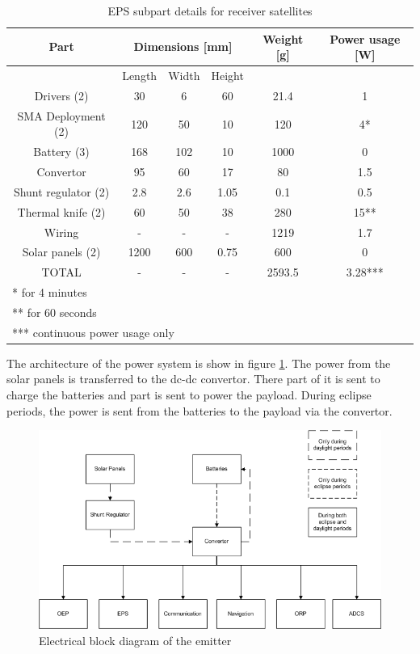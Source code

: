 \begin{table}[H!]
\centering
\begin{tabular}{cccccc}
\toprule
Part & \multicolumn{3}{c}{Dimensions [mm]} & Weight [g] & Power usage [W]\\ 
\midrule
 & Length & Width & Height & & \\ 
 Drivers (2) & 30 & 6 & 60 & 21.4 & 1 \\ 
 SMA Deployment (2) & 120 & 50 & 10 & 120 & 4* \\ 
 Battery (3) & 168 & 102 & 10 & 1000 & 0 \\ 
 Convertor & 95 & 60 & 17 & 80 & 1.5 \\ 
 Shunt regulator (2) & 2.8 & 2.6 & 1.05 & 0.1 & 0.5 \\ 
 Thermal knife (2) & 60 & 50 & 38 & 280 & 15**  \\
 Wiring & - & - & - & 1219 & 1.7 \\ 
 Solar panels (2) & 1200 & 600 & 0.75 & 600 & 0 \\
 \midrule
 TOTAL & - & - & - & 2593.5 & 3.28***  \\ 
\bottomrule
 \multicolumn{6}{l}{* for 4 minutes} \\
 \multicolumn{6}{l}{** for 60 seconds} \\
 \multicolumn{6}{l}{*** continuous power usage only} \\
\end{tabular}
\caption{EPS subpart details for receiver satellites}
\label{tab:EPS_details}
\end{table}

The architecture of the power system is show in figure \ref{fig:emitter_block}. The power from the solar panels is transferred to the dc-dc convertor. There part of it is sent to charge the batteries and part is sent to power the payload. During eclipse periods, the power is sent from the batteries to the payload via the convertor.

\begin{figure}[H!]
\centering
\includegraphics{img/EPS emitter block diagram.png}
\caption{Electrical block diagram of the emitter}
\label{fig:emitter_block}
\end{figure}
